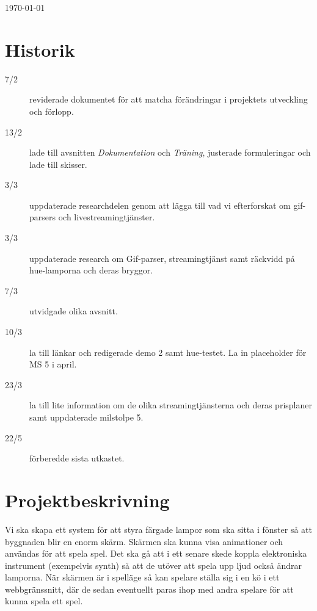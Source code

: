 \documentclass[a4paper,11pt]{article}
\begin{document}
\begin{titlepage}
\begin{center}
\vfill

{\large \today}

\end{center}
\end{titlepage}

\pagebreak
\section*{Historik}
  \begin{description}
    \item[7/2]  reviderade dokumentet för att matcha förändringar i projektets
                utveckling och förlopp.
    \item[13/2] lade till avsnitten \emph{Dokumentation} och
                \emph{Träning}, justerade formuleringar och lade till
                skisser.
    \item[3/3]  uppdaterade researchdelen genom att lägga till vad vi
                efterforskat om gif-parsers och livestreamingtjänster.
    \item[3/3]  uppdaterade research om Gif-parser, streamingtjänst samt
                räckvidd på hue-lamporna och deras bryggor.
    \item[7/3]  utvidgade olika avsnitt.
    \item[10/3] la till länkar och redigerade demo 2 samt hue-testet. La in
                placeholder för MS 5 i april.
    \item[23/3] la till lite information om de olika streamingtjänsterna och
                deras prisplaner samt uppdaterade milstolpe 5.
    \item[22/5] förberedde sista utkastet.
  \end{description}

\pagebreak
\tableofcontents
\pagebreak

\pagestyle{fancy}


\section{Projektbeskrivning}

  Vi ska skapa ett system för att styra färgade lampor som ska sitta i
  fönster så att byggnaden blir en enorm skärm.  Skärmen ska kunna visa
  animationer och användas för att spela spel.  Det ska gå att i ett senare
  skede koppla elektroniska instrument (exempelvis synth) så att de utöver
  att spela upp ljud också ändrar lamporna.  När skärmen är i spelläge så kan
  spelare ställa sig i en kö i ett webbgränssnitt, där de sedan eventuellt
  paras ihop med andra spelare för att kunna spela ett spel.
\end{document}
